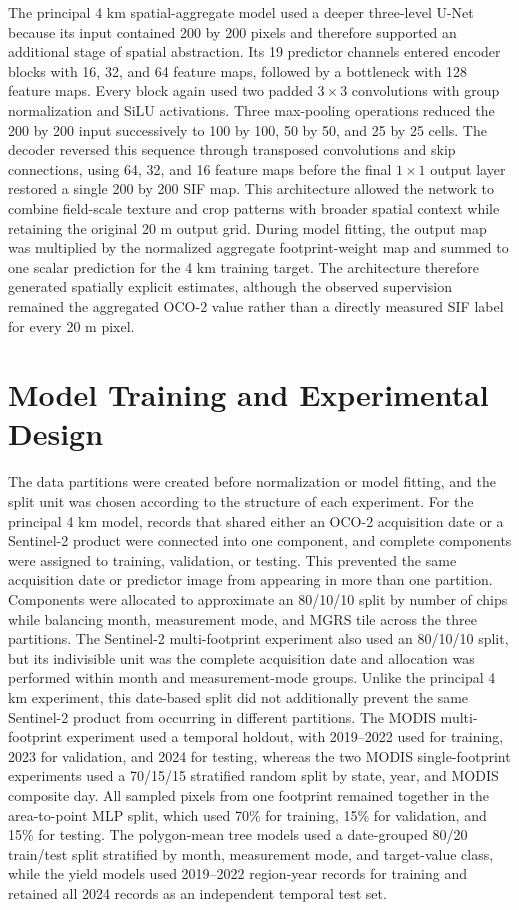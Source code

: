 The principal 4 km spatial-aggregate model used a deeper three-level U-Net because its input contained 200 by 200 pixels and therefore supported an additional stage of spatial abstraction. Its 19 predictor channels entered encoder blocks with 16, 32, and 64 feature maps, followed by a bottleneck with 128 feature maps. Every block again used two padded $3\times3$ convolutions with group normalization and SiLU activations. Three max-pooling operations reduced the 200 by 200 input successively to 100 by 100, 50 by 50, and 25 by 25 cells. The decoder reversed this sequence through transposed convolutions and skip connections, using 64, 32, and 16 feature maps before the final $1\times1$ output layer restored a single 200 by 200 SIF map. This architecture allowed the network to combine field-scale texture and crop patterns with broader spatial context while retaining the original 20 m output grid. During model fitting, the output map was multiplied by the normalized aggregate footprint-weight map and summed to one scalar prediction for the 4 km training target. The architecture therefore generated spatially explicit estimates, although the observed supervision remained the aggregated OCO-2 value rather than a directly measured SIF label for every 20 m pixel.

\section{Model Training and Experimental Design}

The data partitions were created before normalization or model fitting, and the split unit was chosen according to the structure of each experiment. For the principal 4 km model, records that shared either an OCO-2 acquisition date or a Sentinel-2 product were connected into one component, and complete components were assigned to training, validation, or testing. This prevented the same acquisition date or predictor image from appearing in more than one partition. Components were allocated to approximate an 80/10/10 split by number of chips while balancing month, measurement mode, and MGRS tile across the three partitions. The Sentinel-2 multi-footprint experiment also used an 80/10/10 split, but its indivisible unit was the complete acquisition date and allocation was performed within month and measurement-mode groups. Unlike the principal 4 km experiment, this date-based split did not additionally prevent the same Sentinel-2 product from occurring in different partitions. The MODIS multi-footprint experiment used a temporal holdout, with 2019--2022 used for training, 2023 for validation, and 2024 for testing, whereas the two MODIS single-footprint experiments used a 70/15/15 stratified random split by state, year, and MODIS composite day. All sampled pixels from one footprint remained together in the area-to-point MLP split, which used 70\% for training, 15\% for validation, and 15\% for testing. The polygon-mean tree models used a date-grouped 80/20 train/test split stratified by month, measurement mode, and target-value class, while the yield models used 2019--2022 region-year records for training and retained all 2024 records as an independent temporal test set.

